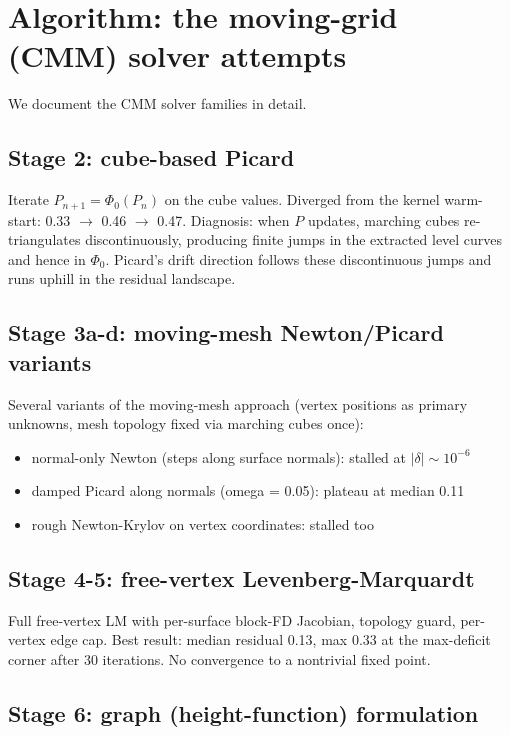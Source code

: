 \documentclass[11pt]{article}
\newcommand{\1}{\mathbf{1}}
\begin{document}
\section{Algorithm: the moving-grid (CMM) solver attempts}
\label{app:cmm}

We document the CMM solver families in detail.

\subsection{Stage 2: cube-based Picard}

Iterate $P_{n+1} = \Phi_0(P_n)$ on the cube values.  Diverged from the
kernel warm-start: 0.33 $\to$ 0.46 $\to$ 0.47.  Diagnosis: when $P$ updates,
marching cubes re-triangulates discontinuously, producing finite jumps
in the extracted level curves and hence in $\Phi_0$.  Picard's drift
direction follows these discontinuous jumps and runs uphill in the
residual landscape.

\subsection{Stage 3a-d: moving-mesh Newton/Picard variants}

Several variants of the moving-mesh approach (vertex positions as
primary unknowns, mesh topology fixed via marching cubes once):
\begin{itemize}
\item normal-only Newton (steps along surface normals): stalled at
$|\delta| \sim 10^{-6}$
\item damped Picard along normals (omega = 0.05): plateau at median
0.11
\item rough Newton-Krylov on vertex coordinates: stalled too
\end{itemize}

\subsection{Stage 4-5: free-vertex Levenberg-Marquardt}

Full free-vertex LM with per-surface block-FD Jacobian, topology guard,
per-vertex edge cap.  Best result: median residual 0.13, max 0.33 at
the max-deficit corner after 30 iterations.  No convergence to a
nontrivial fixed point.

\subsection{Stage 6: graph (height-function) formulation}
\end{document}
